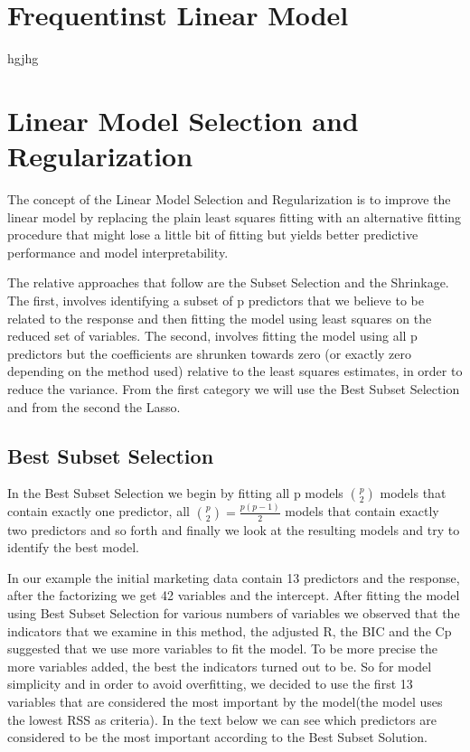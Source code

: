 \documentclass[11pt]{article}
\begin{document}
\section{ Frequentinst Linear Model }
hgjhg


\section{Linear Model Selection and Regularization}  
The concept of the Linear Model Selection and Regularization is to improve the linear model by replacing the plain least squares fitting with an alternative fitting procedure that might lose a little bit of fitting but yields better predictive performance and model interpretability. 

The relative approaches that follow are the Subset Selection and the Shrinkage. The first, involves identifying a subset of p predictors that we believe to be related to the response and then fitting the model using least squares on the reduced set of variables. The second, involves fitting the model using all p predictors but the coefficients are shrunken towards zero (or exactly zero depending on the method used) relative to the least squares estimates, in order to reduce the variance. From the first category we will use the Best Subset Selection and from the second the Lasso.

\subsection{Best Subset Selection}

In the Best Subset Selection we begin by fitting all p models $\binom{p}{2}$ models that contain exactly one predictor, all $\binom{p}{2} =\frac{p(p-1)}2$ models that contain exactly two predictors and so forth and finally we look at the resulting models and try to identify the best model.

In our example the initial marketing data contain 13 predictors and the response, after the factorizing we get 42 variables and the intercept. After fitting the model using Best Subset Selection for various numbers of variables we observed that the indicators that we examine in this method, the adjusted R, the BIC and the Cp suggested that we use more variables to fit the model. To be more precise the more variables added, the best the indicators turned out to be. So for model simplicity and in order to avoid overfitting, we decided to use the first 13 variables that are considered the most important by the model(the model uses the lowest RSS as criteria). In the text below we can see which predictors are considered to be the most important according to the Best Subset Solution.
\end{document}
